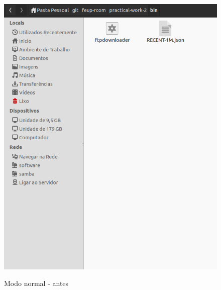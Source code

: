 \documentclass[a4paper]{article}
\begin{document}
\pagebreak

\begin{figure}[h!]
\centering
\caption{Modo normal - antes}
\includegraphics[scale=0.35]{res/depois-modoanonimo.png}
\label{fig:antesnormal}
\end{figure}
\end{document}
